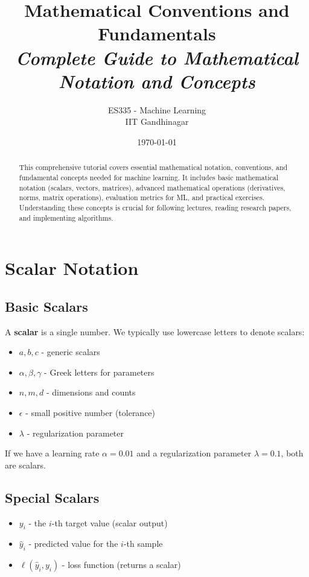 \documentclass{article}
\title{\textbf{Mathematical Conventions and Fundamentals} \\ \textit{Complete Guide to Mathematical Notation and Concepts}}
\author{ES335 - Machine Learning \\ IIT Gandhinagar}
\date{\today}
\newcounter{exercise}
\begin{document}
\maketitle

\begin{abstract}
This comprehensive tutorial covers essential mathematical notation, conventions, and fundamental concepts needed for machine learning. It includes basic mathematical notation (scalars, vectors, matrices), advanced mathematical operations (derivatives, norms, matrix operations), evaluation metrics for ML, and practical exercises. Understanding these concepts is crucial for following lectures, reading research papers, and implementing algorithms.
\end{abstract}

\tableofcontents
\newpage

\section{Scalar Notation}

\subsection{Basic Scalars}
A \textbf{scalar} is a single number. We typically use lowercase letters to denote scalars:
\begin{itemize}
    \item $a, b, c$ - generic scalars
    \item $\alpha, \beta, \gamma$ - Greek letters for parameters
    \item $n, m, d$ - dimensions and counts
    \item $\epsilon$ - small positive number (tolerance)
    \item $\lambda$ - regularization parameter
\end{itemize}

\begin{tcolorbox}[colback=green!5!white,colframe=green!75!black,title=Example]
If we have a learning rate $\alpha = 0.01$ and a regularization parameter $\lambda = 0.1$, both are scalars.
\end{tcolorbox}

\subsection{Special Scalars}
\begin{itemize}
    \item $y_i$ - the $i$-th target value (scalar output)
    \item $\hat{y}_i$ - predicted value for the $i$-th sample
    \item $\ell(\hat{y}_i, y_i)$ - loss function (returns a scalar)
\end{itemize}
\end{document}

